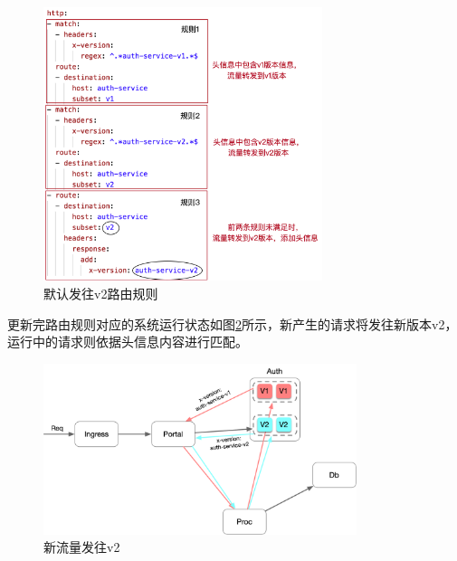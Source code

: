 \documentclass[a4paper, 12pt]{article}
\theoremstyle{definition}
\begin{document}
\begin{figure}[ht]
 \centering
 \includegraphics[height=8cm]{images/vs_default_v2.png}
 \caption{默认发往v2路由规则}
 \label{fig:vs_default_v2}
\end{figure}

更新完路由规则对应的系统运行状态如图\ref{fig:traffic_v1v2}所示，新产生的请求将发往新版本v2，运行中的请求则依据头信息内容进行匹配。
\begin{figure}[ht]
 \centering
 \includegraphics[height=5cm]{images/traffic_v1v2.png}
 \caption{新流量发往v2}
 \label{fig:traffic_v1v2}
\end{figure}
\end{document}
